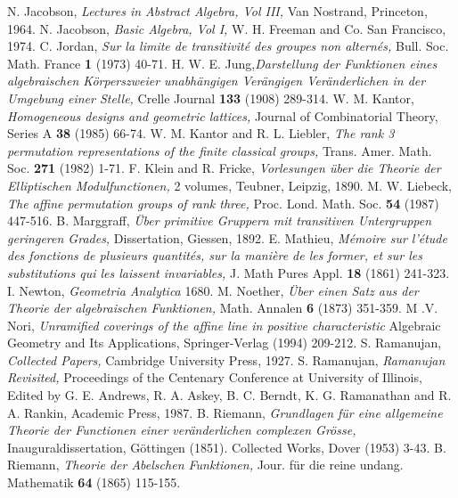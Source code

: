 \begin{thebibliography}{99}
 N. Jacobson, \textit{Lectures in Abstract Algebra, Vol III,} Van Nostrand, Princeton, 1964.
 N. Jacobson, \textit{Basic Algebra, Vol I,} W. H. Freeman and Co. San Francisco, 1974.
 C. Jordan, \textit{Sur la limite de transitivit\'e des groupes non altern\'es,} Bull. Soc. Math. France {\bf 1} (1973) 40-71.
 H. W. E. Jung,\textit{Darstellung der Funktionen eines algebraischen K\"orperszweier unabh\"angigen Ver\"angigen Ver\"anderlichen in der Umgebung einer Stelle,} Crelle Journal {\bf 133} (1908) 289-314.
 W. M. Kantor, \textit{Homogeneous designs and geometric lattices,} Journal of Combinatorial Theory, Series A {\bf 38} (1985) 66-74.
 W. M. Kantor and R. L. Liebler, \textit{The rank  3 permutation representations of the finite classical groups,} Trans. Amer. Math. Soc. {\bf 271} (1982) 1-71.
 F. Klein and R. Fricke, \textit{Vorlesungen \"uber die Theorie der Elliptischen Modulfunctionen,} 2 volumes, Teubner, Leipzig, 1890.
 M. W. Liebeck, \textit{The affine permutation groups of rank three,} Proc. Lond. Math. Soc. {\bf 54} (1987) 447-516.
 B. Marggraff, \textit{\"Uber primitive Gruppern mit transitiven Untergruppen geringeren Grades,} Dissertation, Giessen, 1892.
 E. Mathieu, \textit{M\'emoire sur l'\'etude des fonctions de plusieurs quantit\'es, sur la mani\`ere de les former, et sur les substitutions qui les laissent invariables,} J. Math Pures Appl. {\bf 18} (1861) 241-323.
 I. Newton, \textit{Geometria Analytica} 1680.
 M. Noether, \textit{\"Uber einen Satz aus der Theorie der algebraischen Funktionen,} Math. Annalen {\bf 6} (1873) 351-359.
 M .V. Nori, \textit{Unramified coverings of the affine line in positive characteristic} Algebraic Geometry and Its Applications, Springer-Verlag (1994) 209-212.
 S. Ramanujan, \textit{Collected Papers,} Cambridge University Press, 1927.
 S. Ramanujan, \textit{Ramanujan Revisited,} Proceedings of the Centenary Conference at University of Illinois, Edited by G. E. Andrews, R. A. Askey, B. C. Berndt, K. G. Ramanathan and R. A. Rankin, Academic Press, 1987.
 B. Riemann, \textit{Grundlagen f\"ur eine allgemeine Theorie der Functionen einer ver\"anderlichen complexen Gr\"osse,} Inauguraldissertation, G\"ottingen (1851). Collected Works, Dover (1953) 3-43.
 B. Riemann, \textit{Theorie der Abelschen Funktionen,} Jour. f\"ur die reine undang. Mathematik {\bf 64} (1865) 115-155.

\end{thebibliography}
